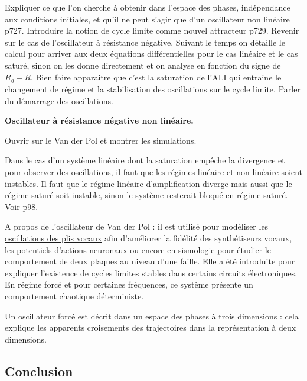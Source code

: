 Expliquer ce que l'on cherche à obtenir dans l'espace des phases, indépendance aux conditions initiales, et qu'il ne peut s'agir que d'un oscillateur non linéaire \cite{Gie1992} p727.
Introduire la notion de cycle limite comme nouvel attracteur \cite{Gie1992} p729.
Revenir sur le cas de l'oscillateur à résistance négative.
Suivant le temps on détaille le calcul pour arriver aux deux équations différentielles pour le cas linéaire et le cas saturé, sinon on les donne directement et on analyse en fonction du signe de $R_g-R$.
Bien faire apparaitre que c'est la saturation de l'ALI qui entraine le changement de régime et la stabilisation des oscillations sur le cycle limite.
Parler du démarrage des oscillations.

\begin{experience}
\textbf{Oscillateur à résistance négative non linéaire.}
\end{experience}

Ouvrir sur le Van der Pol et montrer les simulations.

\begin{remarque}
Dans le cas d'un système linéaire dont la saturation empêche la divergence et pour observer des oscillations, il faut que les régimes linéaire et non linéaire soient instables.
Il faut que le régime linéaire d'amplification diverge mais aussi que le régime saturé soit instable, sinon le système resterait bloqué en régime saturé.
Voir \cite{Neveu2019a} p98.

\noindent
A propos de l'oscillateur de Van der Pol : il est utilisé pour modéliser les \href{https://asa.scitation.org/doi/abs/10.1121/1.4798467}{oscillations des plis vocaux} afin d'améliorer la fidélité des synthétiseurs vocaux, les potentiels d'actions neuronaux ou encore en sismologie pour étudier le comportement de deux plaques au niveau d'une faille.
Elle a été introduite pour expliquer l'existence de cycles limites stables dans certains circuits électroniques.
En régime forcé et pour certaines fréquences, ce système présente un comportement chaotique déterministe.

\noindent
Un oscillateur forcé est décrit dans un espace des phases à trois dimensions : cela explique les apparents croisements des trajectoires dans la représentation à deux dimensions.
\end{remarque}

\subsection*{Conclusion}

